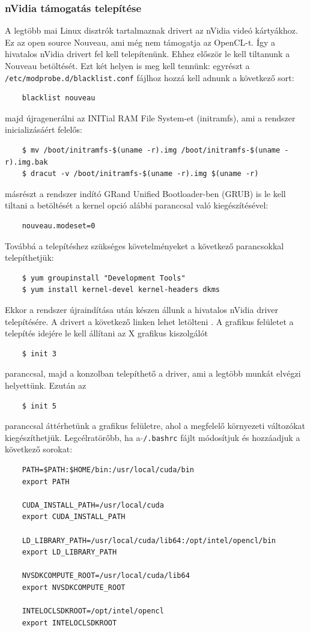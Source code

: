 \subsubsection{nVidia támogatás telepítése}
	A legtöbb mai Linux disztrók tartalmaznak drivert az nVidia videó kártyákhoz.
	Ez az open source Nouveau, ami még nem támogatja az OpenCL-t.
	Így a hivatalos nVidia drivert fel kell telepítenünk.
	Ehhez először le kell tiltanunk a Nouveau betöltését.
	Ezt két helyen is meg kell tennünk: 
	egyrészt a \texttt{/etc/modprobe.d/blacklist.conf} fájlhoz hozzá kell adnunk a
	következő sort:
	\begin{lstlisting}
	blacklist nouveau
	\end{lstlisting}
	majd újragenerálni az INITial RAM File System-et (initramfs), ami a rendszer
	inicializásáért felelős:
	\begin{lstlisting}
	$ mv /boot/initramfs-$(uname -r).img /boot/initramfs-$(uname -r).img.bak
	$ dracut -v /boot/initramfs-$(uname -r).img $(uname -r)
	\end{lstlisting}
	másrészt a rendszer indító GRand Unified Bootloader-ben (GRUB) is le kell
	tiltani a betöltését a kernel opció alábbi paranccsal való kiegészítésével:
	\begin{lstlisting}
	nouveau.modeset=0
	\end{lstlisting}
	Továbbá a telepítéshez szükséges követelményeket a következő parancsokkal telepíthetjük:
	\begin{lstlisting}
	$ yum groupinstall "Development Tools"
	$ yum install kernel-devel kernel-headers dkms
	\end{lstlisting}
	Ekkor a rendszer újraindítása után készen állunk a hivatalos nVidia driver
	telepítésére. A drivert a következő linken lehet letölteni \cite{nvidia-driver}.
	A grafikus felületet a telepítés idejére le kell állítani az X grafikus
	kiszolgálót
	\begin{lstlisting}
	$ init 3
	\end{lstlisting}
	paranccsal, majd a konzolban telepíthető a driver, ami a legtöbb munkát elvégzi helyettünk. Ezután az
	\begin{lstlisting}
	$ init 5
	\end{lstlisting}
	paranccsal áttérhetünk a grafikus felületre, ahol a megfelelő környezeti változókat kiegészíthetjük.
	Legcélratörőbb, ha a \texttt{$\tilde{}$/.bashrc} fájlt módosítjuk és hozzáadjuk
	a következő sorokat:
	\begin{lstlisting}
	PATH=$PATH:$HOME/bin:/usr/local/cuda/bin
	export PATH
	
	CUDA_INSTALL_PATH=/usr/local/cuda
	export CUDA_INSTALL_PATH
	
	LD_LIBRARY_PATH=/usr/local/cuda/lib64:/opt/intel/opencl/bin
	export LD_LIBRARY_PATH
	
	NVSDKCOMPUTE_ROOT=/usr/local/cuda/lib64
	export NVSDKCOMPUTE_ROOT
	
	INTELOCLSDKROOT=/opt/intel/opencl
	export INTELOCLSDKROOT
	\end{lstlisting}

